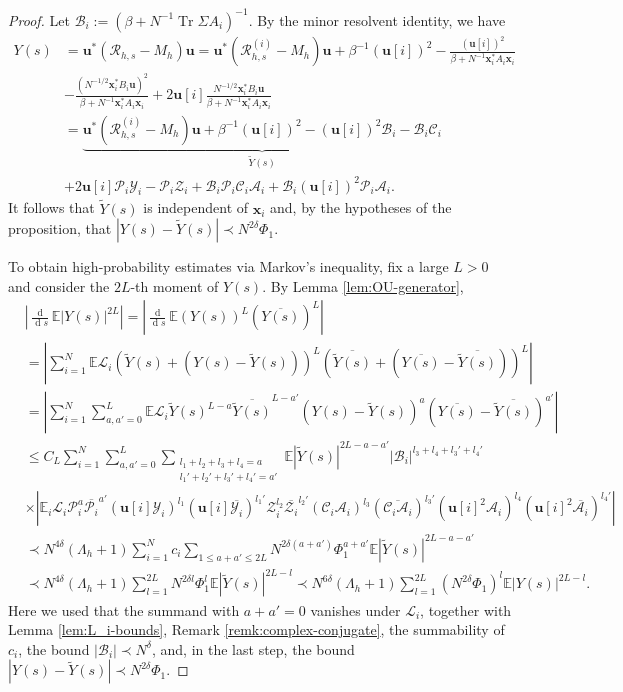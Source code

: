 \documentclass[11pt,reqno]{amsart}
\def\u{\mathbf{u}}
\def\x{\mathbf{x}}
\def\E{\mathbb{E}}
\def\cA{\mathcal{A}}
\def\cY{\mathcal{Y}}
\def\cZ{\mathcal{Z}}
\def\cB{\mathcal{B}}
\def\cP{\mathcal{P}}
\def\cC{\mathcal{C}}
\def\cL{\mathcal{L}}
\def\cR{\mathcal{R}}
\def\de{\operatorname{d}}
\def\Tr{\operatorname{Tr}}
\theoremstyle{definition}
\numberwithin{equation}{section}
\numberwithin{figure}{section}
\begin{document}
\begin{proof}
Let $\cB_i:=(\beta+N^{-1}\Tr\Sigma A_i)^{-1}$. By the minor resolvent identity, we have
\begin{align*}
    Y(s)&=\u^*(\cR_{h,s}-M_h)\u=\u^*(\cR_{h,s}^{(i)}-M_h)\u+\beta^{-1}(\u[i])^2-\frac{(\u[i])^2}{\beta+N^{-1}\x_i^*A_i\x_i}\\
    &-\frac{(N^{-1/2}\x_i^*B_i\u)^2}{\beta+N^{-1}\x_i^*A_i\x_i}+2\u[i]\frac{N^{-1/2}\x_i^*B_i\u}{\beta+N^{-1}\x_i^*A_i\x_i}\\
    &=\underbrace{\u^*(\cR_{h,s}^{(i)}-M_h)\u+\beta^{-1}(\u[i])^2-(\u[i])^2\cB_i-\cB_i\cC_i}_{\widetilde Y(s)}\\
    &+2\u[i]\cP_i\cY_i-\cP_i\cZ_i+\cB_i\cP_i\cC_i\cA_i+\cB_i(\u[i])^2\cP_i\cA_i.
\end{align*}
It follows that $\widetilde Y(s)$ is independent of $\x_i$ and, by the hypotheses of the proposition, that $|Y(s)-\widetilde Y(s)|\prec N^{2\delta}\Phi_1$.

To obtain high-probability estimates via Markov's inequality, fix a large $L>0$ and consider the $2L$-th moment of $Y(s)$. By Lemma \ref{lem:OU-generator},
\begin{align*}
    &\left|\frac{\de}{\de s}\E|Y(s)|^{2L}\right|=\left|\frac{\de}{\de s}\E(Y(s))^L(\overline{Y(s)})^L\right|\\
    &=\left|\sum_{i=1}^N\E\cL_i(\widetilde Y(s)+(Y(s)-\widetilde Y(s)))^L(\overline{\widetilde Y(s)}+(\overline{Y(s)}-\overline{\widetilde Y(s)}))^L\right|\\
    &=\left|\sum_{i=1}^N\sum_{a,a'=0}^L\E\cL_i\widetilde Y(s)^{L-a}\overline{\widetilde Y(s)}^{L-a'}(Y(s)-\widetilde Y(s))^a(\overline{Y(s)}-\overline{\widetilde Y(s)})^{a'}\right|\\
    &\leq C_L\sum_{i=1}^N\sum_{a,a'=0}^L\sum_{\substack{l_1+l_2+l_3+l_4=a\\l_1'+l_2'+l_3'+l_4'=a'}}\E|\widetilde Y(s)|^{2L-a-a'}|\cB_i|^{l_3+l_4+l_3'+l_4'}\\
    &\times|\E_i\cL_i\cP_i^{a}\overline{\cP_i}^{a'}(\u[i]\cY_i)^{l_1}(\u[i]\overline{\cY_i})^{l_1'}\cZ_i^{l_2}\overline{\cZ_i}^{l_2'}(\cC_i\cA_i)^{l_3}(\overline{\cC_i\cA_i})^{l_3'}(\u[i]^2\cA_i)^{l_4}(\u[i]^2\overline{\cA_i})^{l_4'}|\\
    &\prec N^{4\delta}(\Lambda_h+1)\sum_{i=1}^Nc_i\sum_{1\leq a+a'\leq 2L}N^{2\delta(a+a')}\Phi_1^{a+a'}\E|\widetilde Y(s)|^{2L-a-a'}\\
    &\prec N^{4\delta}(\Lambda_h+1)\sum_{l=1}^{2L}N^{2\delta l}\Phi_1^{l}\E|\widetilde Y(s)|^{2L-l}\prec N^{6\delta}(\Lambda_h+1)\sum_{l=1}^{2L}(N^{2\delta}\Phi_1)^{l}\E|Y(s)|^{2L-l}.
\end{align*}
Here we used that the summand with $a+a'=0$ vanishes under $\cL_i$, together with Lemma \ref{lem:L_i-bounds}, Remark \ref{remk:complex-conjugate}, the summability of $c_i$, the bound $|\cB_i|\prec N^\delta$, and, in the last step, the bound $|Y(s)-\widetilde Y(s)|\prec N^{2\delta}\Phi_1$.


\end{proof}
\end{document}
